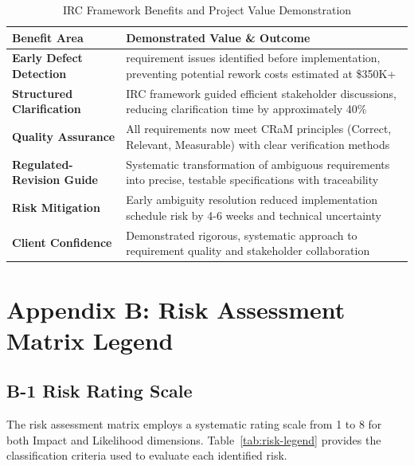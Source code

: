 \documentclass[11pt,a4paper]{article}
\begin{document}
\begin{table}[H]
\centering
\small
\renewcommand{\arraystretch}{1.3}
\begin{tabular}{|>{\raggedright\arraybackslash}p{}|>{\raggedright\arraybackslash}p{}|}
\hline
\rowcolor{tableheader}
\textbf{Benefit Area} & \textbf{Demonstrated Value \& Outcome} \\
\hline
\textbf{Early Defect Detection} & 15 requirement issues identified before implementation, preventing potential rework costs estimated at \$350K+ \\
\hline
\textbf{Structured Clarification} & IRC framework guided efficient stakeholder discussions, reducing clarification time by approximately 40\% \\
\hline
\textbf{Quality Assurance} & All requirements now meet CRaM principles (Correct, Relevant, Measurable) with clear verification methods \\
\hline
\textbf{Regulated-Revision Guide} & Systematic transformation of ambiguous requirements into precise, testable specifications with traceability \\
\hline
\textbf{Risk Mitigation} & Early ambiguity resolution reduced implementation schedule risk by 4-6 weeks and technical uncertainty \\
\hline
\textbf{Client Confidence} & Demonstrated rigorous, systematic approach to requirement quality and stakeholder collaboration \\
\hline
\end{tabular}
\caption{IRC Framework Benefits and Project Value Demonstration}
\label{tab:irc-benefits}
\end{table}

\newpage
\setcounter{page}{1}
\renewcommand{\thepage}{B-\arabic{page}}
\section*{Appendix B: Risk Assessment Matrix Legend}
\label{app:risk-matrix}

\subsection*{B-1 Risk Rating Scale}

The risk assessment matrix employs a systematic rating scale from 1 to 8 for both Impact and Likelihood dimensions. Table~\ref{tab:risk-legend} provides the classification criteria used to evaluate each identified risk.
\end{document}
